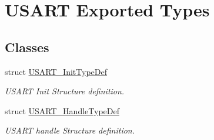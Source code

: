\hypertarget{group___u_s_a_r_t___exported___types}{}\section{U\+S\+A\+RT Exported Types}
\label{group___u_s_a_r_t___exported___types}
\subsection*{Classes}
\begin{DoxyCompactItemize}
\item 
struct \hyperlink{struct_u_s_a_r_t___init_type_def}{U\+S\+A\+R\+T\+\_\+\+Init\+Type\+Def}
\begin{DoxyCompactList}\small\item\em U\+S\+A\+RT Init Structure definition. \end{DoxyCompactList}\item 
struct \hyperlink{struct_u_s_a_r_t___handle_type_def}{U\+S\+A\+R\+T\+\_\+\+Handle\+Type\+Def}
\begin{DoxyCompactList}\small\item\em U\+S\+A\+RT handle Structure definition. \end{DoxyCompactList}\end{DoxyCompactItemize}

